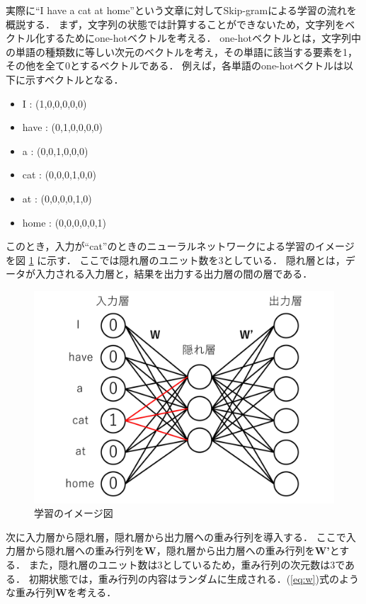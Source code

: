 \documentclass{thesis}
\begin{document}
実際に``I have a cat at home''という文章に対してSkip-gramによる学習の流れを概説する．
まず，文字列の状態では計算することができないため，文字列をベクトル化するためにone-hotベクトルを考える．
one-hotベクトルとは，文字列中の単語の種類数に等しい次元のベクトルを考え，その単語に該当する要素を1，その他を全て0とするベクトルである．
例えば，各単語のone-hotベクトルは以下に示すベクトルとなる．

\begin{itemize}
	\item I : (1,0,0,0,0,0)
	\item have : (0,1,0,0,0,0)
	\item a : (0,0,1,0,0,0)
	\item cat : (0,0,0,1,0,0)
	\item at : (0,0,0,0,1,0)
	\item home : (0,0,0,0,0,1)
\end{itemize}

このとき，入力が``cat''のときのニューラルネットワークによる学習のイメージを図 \ref{fig:イメージ図} に示す．
ここでは隠れ層のユニット数を3としている．
隠れ層とは，データが入力される入力層と，結果を出力する出力層の間の層である．

\begin{figure}[H]
	\centering
	\includegraphics[scale=0.5]{./image/word2vec_nn.pdf}
	\caption{学習のイメージ図}
	\label{fig:イメージ図}
\end{figure}

次に入力層から隠れ層，隠れ層から出力層への重み行列を導入する．
ここで入力層から隠れ層への重み行列を\textbf{W}，隠れ層から出力層への重み行列を\textbf{W'}とする．
また，隠れ層のユニット数は3としているため，重み行列の次元数は3である．
初期状態では，重み行列の内容はランダムに生成される．(\ref{eq:w})式のような重み行列\textbf{W}を考える．
\end{document}
